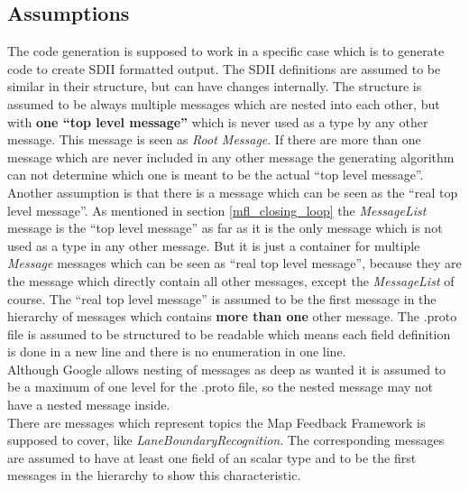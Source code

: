 \subsection{Assumptions}
\label{mfl_generation_assumptions}
The code generation is supposed to work in a specific case which is to generate code to create SDII formatted output. The SDII definitions are assumed to be similar in their structure, but can have changes internally. The structure is assumed to be always multiple messages which are nested into each other, but with \textbf{one \enquote{top level message}} which is never used as a type by any other message. This message is seen as \emph{Root Message}. If there are more than one message which are never included in any other message the generating algorithm can not determine which one is meant to be the actual \enquote{top level message}.\\
Another assumption is that there is a message which can be seen as the \enquote{real top level message}. As mentioned in section \ref{mfl_closing_loop} the \emph{MessageList} message is the \enquote{top level message} as far as it is the only message which is not used as a type in any other message. But it is just a container for multiple \emph{Message} messages which can be seen as \enquote{real top level message}, because they are the message which directly contain all other messages, except the \emph{MessageList} of course. The \enquote{real top level message} is assumed to be the first message in the hierarchy of messages which contains \textbf{more than one} other message.
The .proto file is assumed to be structured to be readable which means each field definition is done in a new line and there is no enumeration in one line.\\
Although Google allows nesting of messages as deep as wanted it is assumed to be a maximum of one level for the .proto file, so the nested message may not have a nested message inside.\\
There are messages which represent topics the Map Feedback Framework is supposed to cover, like \emph{LaneBoundaryRecognition}. The corresponding messages are assumed to have at least one field of an scalar type and to be the first messages in the hierarchy to show this characteristic.

